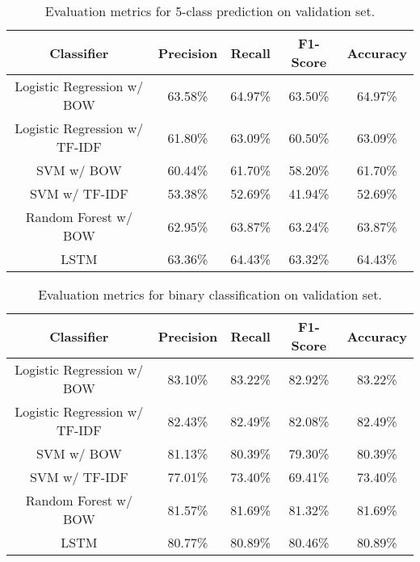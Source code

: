 \documentclass{article}
\begin{document}
\begin{table}[H]
\centering
\begin{tabular}{|c|cccc|}
\hline
Classifier                    & Precision & Recall  & F1-Score & Accuracy \\ \hline
\cellcolor[gray]{.8} Logistic Regression w/ BOW & \cellcolor[gray]{.8}63.58\%   & \cellcolor[gray]{.8}64.97\% & \cellcolor[gray]{.8}63.50\%  & \cellcolor[gray]{.8}64.97\%  \\
Logistic Regression w/ TF-IDF & 61.80\% & 63.09\% & 60.50\%  & 63.09\%  \\
SVM w/ BOW                    & 60.44\%   & 61.70\% & 58.20\%  & 61.70\%  \\
SVM w/ TF-IDF                 & 53.38\%   & 52.69\% & 41.94\%  & 52.69\%  \\
Random Forest w/ BOW                    & 62.95\%   & 63.87\% & 63.24\%  & 63.87\%  \\
LSTM                          & 63.36\%   & 64.43\% & 63.32\%  & 64.43\%  \\ \hline
\end{tabular}
\caption{Evaluation metrics for 5-class prediction on validation set.}
\label{tab:val_results_5}
\end{table}
\begin{table}[H]
\centering
\begin{tabular}{|c|cccc|}
\hline
Classifier                    & Precision & Recall  & F1-Score & Accuracy \\ \hline
Logistic Regression w/ BOW  \cellcolor[gray]{.8}  & \cellcolor[gray]{.8} 83.10\%  &\cellcolor[gray]{.8} 83.22\% & \cellcolor[gray]{.8} 82.92\%  &\cellcolor[gray]{.8} 83.22\%  \\
Logistic Regression w/ TF-IDF & 82.43\%   & 82.49\% & 82.08\%  & 82.49\%  \\
SVM w/ BOW                    & 81.13\%   & 80.39\% & 79.30\%  & 80.39\%  \\
SVM w/ TF-IDF                 & 77.01\%   & 73.40\% & 69.41\%  & 73.40\%  \\
Random Forest w/ BOW                    & 81.57\%   & 81.69\% & 81.32\%  & 81.69\%  \\
LSTM                          & 80.77\%          & 80.89\%         & 80.46\%          & 80.89\%          \\ \hline
\end{tabular}
\caption{Evaluation metrics for binary classification on validation set.}
\label{tab:val_results_binary}
\end{table}
\end{document}
